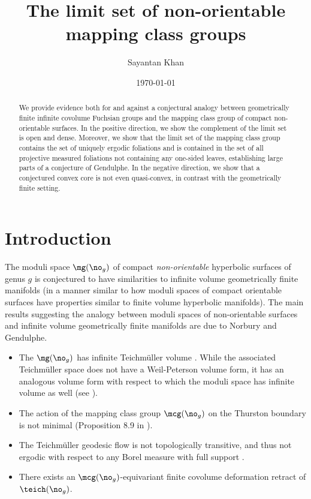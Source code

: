 \documentclass[12pt, reqno]{amsart}
\title{The limit set of non-orientable mapping class groups}
\author{Sayantan Khan}
\date{\today}
\begin{document}
\begin{abstract}
  We provide evidence both for and against a conjectural analogy between geometrically finite infinite covolume Fuchsian groups and the mapping class group of compact non-orientable surfaces.
  In the positive direction, we show the complement of the limit set is open and dense.
  Moreover, we show that the limit set of the mapping class group contains the set of uniquely ergodic foliations and is contained in the set of all projective measured foliations not containing any one-sided leaves, establishing large parts of a conjecture of Gendulphe.
  In the negative direction, we show that a conjectured convex core is not even quasi-convex, in contrast with the geometrically finite setting.
\end{abstract}
\maketitle


\section{Introduction}
\label{sec:introduction-v2}

The moduli space $\mg(\no_g)$ of compact \emph{non-orientable} hyperbolic surfaces of genus $g$ is conjectured to have similarities to infinite volume geometrically finite manifolds (in a manner similar to how moduli spaces of compact orientable surfaces have properties similar to finite volume hyperbolic manifolds).
The main results suggesting the analogy between moduli spaces of non-orientable surfaces and infinite volume geometrically finite manifolds are due to Norbury and Gendulphe.

\begin{itemize}
\item The $\mg(\no_g)$ has infinite Teichm\"uller volume \cite[Theorem 17.1]{gendulphe_whats_2017}.
  While the associated Teichm\"uller space does not have a Weil-Peterson volume form, it has an analogous volume form with respect to which the moduli space has infinite volume as well (see \cite{norbury2008lengths}).
\item The action of the mapping class group $\mcg(\no_g)$ on the Thurston boundary is not minimal (Proposition 8.9 in \cite{gendulphe_whats_2017}).
\item The Teichm\"uller geodesic flow is not topologically transitive, and thus not ergodic with respect to any Borel measure with full support \cite[Proposition 17.5]{gendulphe_whats_2017}.
\item There exists an $\mcg(\no_g)$-equivariant finite covolume deformation retract of $\teich(\no_g)$.
\end{itemize}
\end{document}
